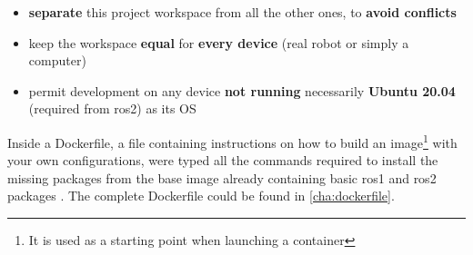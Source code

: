 \begin{itemize}
    \item \textbf{separate} this project workspace from all the other ones, to \textbf{avoid conflicts}
    \item keep the workspace \textbf{equal} for \textbf{every device} (real robot or simply a computer)
    \item permit development on any device \textbf{not running} necessarily \textbf{Ubuntu 20.04} (required from \acrshort{ros}2) as its OS
\end{itemize}  
  
Inside a Dockerfile, a file containing instructions on how to build an image\footnote{It is used as a starting point when launching a container} with your own configurations, were typed all the commands required to install the missing packages from the base image already containing basic \acrshort{ros}1 and \acrshort{ros}2 packages \cite{dockerimage}. The complete Dockerfile could be found in \autoref{cha:dockerfile}.